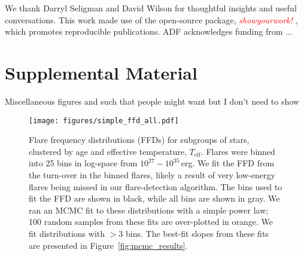 \documentclass[twocolumn]{aastex631}
\begin{document}
\vspace{3mm}

We thank Darryl Seligman and David Wilson for thoughtful insights and useful
conversations. This work made use of the open-source package,
\textcolor{red}{\textit{showyourwork!}} \citep{luger2021}, which promotes
reproducible publications. ADF acknowledges funding from ...

\appendix
\restartappendixnumbering

\section{Supplemental Material}\label{appendix:supp_ffds}

Miscellaneous figures and such that people might want but I don't need to show

\begin{figure*}[ht!]
    \begin{centering}
        \texttt{[image: figures/simple\_ffd\_all.pdf]}
        \caption{
            Flare frequency distributions (FFDs) for subgroups of stars, clustered
            by age and effective temperature, $T_\textrm{eff}$. Flares were binned
            into 25 bins in log-space from $10^{27} - 10^{35}$\,erg. We fit the FFD
            from the turn-over in the binned flares, likely a result of very low-energy
            flares being missed in our flare-detection algorithm. The bins used to fit
            the FFD are shown in black, while all bins are shown in gray. We ran an MCMC
            fit to these distributions with a simple power law; 100 random samples from these
            fits are over-plotted in orange. We fit distributions with $> 3$ bins.
            The best-fit slopes from these fits are presented in Figure~\ref{fig:mcmc_results}.
        }
        \label{fig:simple_ffd_all}
    \end{centering}
\end{figure*}



\end{document}
